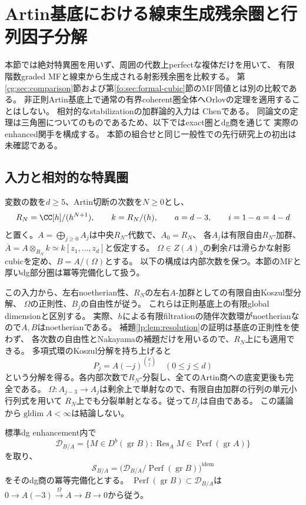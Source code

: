 \section{Artin基底における線束生成残余圏と行列因子分解}
\label{am:sec:comparison}

本節では絶対特異圏を用いず、周囲の代数上perfectな複体だけを用いて、
有限階数graded MFと線束から生成される射影残余圏を比較する。
第\ref{cg:sec:comparison}節および第\ref{fo:sec:formal-cubic}節のMF同値とは別の比較である。
非正則Artin基底上で通常の有界coherent圏全体へOrlovの定理を適用することはしない。
相対的なstabilizationの加群論的入力は
Chen\cite[Theorem 2.10, Corollary 2.11, Theorem 7.2]{AMChen}である。
同論文の定理は三角圏についてのものであるため、以下ではexact圏とdg商を通じて
実際のenhanced関手を構成する。
本節の組合せと同じ一般性での先行研究上の初出は未確認である。

\subsection{入力と相対的な特異圏}

変数の数を$d\ge5$、Artin切断の次数を$N\ge0$とし、
\[
 R_N=\CC[h]/(h^{N+1}),\qquad k=R_N/(h),\qquad
 a=d-3,\qquad i=1-a=4-d
\]
と置く。$A=\bigoplus_{j\ge0}A_j$は中央$R_N$-代数で、$A_0=R_N$、
各$A_j$は有限自由$R_N$-加群、
$\overline A=A\otimes_{R_N}k\simeq k[z_1,\ldots,z_d]$と仮定する。
$\Omega\in Z(A)_3$の剰余$F$は滑らかな射影cubicを定め、$B=A/(\Omega)$とする。
以下の構成は内部次数を保つ。本節のMFと厚いdg部分圏は冪等完備化して扱う。

この入力から、左右noetherian性、$R_N$の左右$A$-加群としての有限自由Koszul型分解、
$\Omega$の正則性、$B_j$の自由性が従う。
これらは正則基底上の有限global dimensionと区別する。
実際、$h$による有限filtrationの随伴次数環がnoetherianなので$A,B$はnoetherianである。
補題\ref{lp:lem:resolution}の証明は基底の正則性を使わず、
各次数の自由性とNakayamaの補題だけを用いるので、$R_N$上にも適用できる。
多項式環のKoszul分解を持ち上げると
\begin{equation}\label{am:eq:relative-koszul}
 P_j=A(-j)^{\binom dj}\quad(0\le j\le d)
\end{equation}
という分解を得る。各内部次数で$R_N$-分裂し、全てのArtin商への底変更後も完全である。
$\Omega:A_{j-3}\to A_j$は剰余上で単射なので、有限自由加群の行列の単元小行列式を用いて
$R_N$上でも分裂単射となる。従って$B_j$は自由である。
この議論から$\operatorname{gldim}A<\infty$は結論しない。

\begin{definition}[周囲でperfectな特異圏]\label{am:def:relative-singularity}
標準dg enhancement内で
\[
 \mathcal D_{B/A}
 =\{M\in D^b(\operatorname{gr}B):
       \operatorname{Res}_A M\in\operatorname{Perf}(\operatorname{gr}A)\}
\]
を取り、
\[
 \mathcal S_{B/A}
 =\bigl(\mathcal D_{B/A}/\operatorname{Perf}(\operatorname{gr}B)\bigr)^{\mathrm{idem}}
\]
をそのdg商の冪等完備化とする。
$\operatorname{Perf}(\operatorname{gr}B)\subset\mathcal D_{B/A}$は
$0\to A(-3)\xrightarrow{\Omega}A\to B\to0$から従う。
\end{definition}

